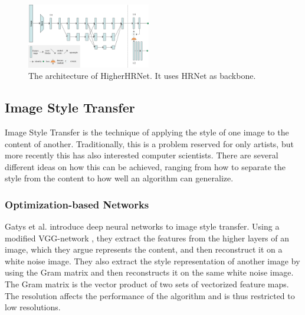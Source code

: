 \documentclass[conference]{IEEEtran}
\begin{document}
\begin{figure}[h]
	\centering
	\includegraphics[width=0.48\textwidth]{higherhrnet}%
	\caption{
		The architecture of HigherHRNet. It uses HRNet as backbone. \cite{Cheng2019}
	}
	\label{fig:higherhrnet}
\end{figure}

\subsection{Image Style Transfer}
Image Style Transfer is the technique of applying the style of one image to the content of another.
Traditionally, this is a problem reserved for only artists, but more recently this has also interested computer scientists.
There are several different ideas on how this can be achieved, ranging from how to separate the style from the content to how well an algorithm can generalize.

\subsubsection{Optimization-based Networks}
Gatys et al. \cite{Gatys2016} introduce deep neural networks to image style transfer.
Using a modified VGG-network \cite{Simonyan2015}, they extract the features from the higher layers of an image, which they argue represents the content, and then reconstruct it on a white noise image.
They also extract the style representation of another image by using the Gram matrix and then reconstructs it on the same white noise image.
The Gram matrix is the vector product of two sets of vectorized feature maps.
The resolution affects the performance of the algorithm and is thus restricted to low resolutions.
\end{document}
